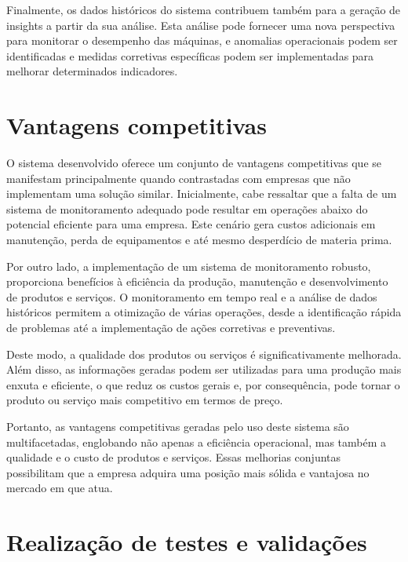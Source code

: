 Finalmente, os dados históricos do sistema contribuem também para a geração de insights a partir da sua análise. Esta análise pode fornecer uma nova perspectiva para monitorar o desempenho das máquinas, e anomalias operacionais podem ser identificadas e medidas corretivas específicas podem ser implementadas para melhorar determinados indicadores.

\section{Vantagens competitivas}\label{sec:competitive}
O sistema desenvolvido oferece um conjunto de vantagens competitivas que se manifestam principalmente quando contrastadas com empresas que não implementam uma solução similar. Inicialmente, cabe ressaltar que a falta de um sistema de monitoramento adequado pode resultar em operações abaixo do potencial eficiente para uma empresa. Este cenário gera custos adicionais em manutenção, perda de equipamentos e até mesmo desperdício de materia prima.

Por outro lado, a implementação de um sistema de monitoramento robusto, proporciona benefícios à eficiência da produção, manutenção e desenvolvimento de produtos e serviços. O monitoramento em tempo real e a análise de dados históricos permitem a otimização de várias operações, desde a identificação rápida de problemas até a implementação de ações corretivas e preventivas. 

Deste modo, a qualidade dos produtos ou serviços é significativamente melhorada. Além disso, as informações geradas podem ser utilizadas para uma produção mais enxuta e eficiente, o que reduz os custos gerais e, por consequência, pode tornar o produto ou serviço mais competitivo em termos de preço.

Portanto, as vantagens competitivas geradas pelo uso deste sistema são multifacetadas, englobando não apenas a eficiência operacional, mas também a qualidade e o custo de produtos e serviços. Essas melhorias conjuntas possibilitam que a empresa adquira uma posição mais sólida e vantajosa no mercado em que atua.

\section{Realização de testes e validações}\label{sec:tests}

